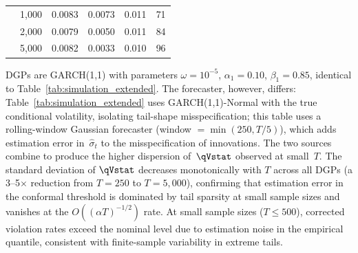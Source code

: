 \begin{table}[H]
\begin{tabular}{@{}llcccc@{}}
		& 1,000   & 0.0083 & 0.0073 & 0.011 & 71 \\
		& 2,000   & 0.0079 & 0.0050 & 0.011 & 84 \\
		& 5,000   & 0.0082 & 0.0033 & 0.010 & 96 \\
		\hline\hline
	\end{tabular}
	\begin{minipage}{\linewidth}\footnotesize
		\smallskip
		DGPs are GARCH(1,1) with parameters
		$\omega = 10^{-5}$, $\alpha_1 = 0.10$, $\beta_1 = 0.85$,
		identical to Table~\ref{tab:simulation_extended}.
		The forecaster, however, differs:
		Table~\ref{tab:simulation_extended} uses GARCH(1,1)-Normal
		with the true conditional volatility, isolating tail-shape
		misspecification; this table uses a rolling-window Gaussian
		forecaster (window $= \min(250, T/5)$), which adds estimation
		error in~$\hat\sigma_t$ to the misspecification of innovations.
		The two sources combine to produce the higher dispersion
		of~$\qVstat$ observed at small~$T$.
		The standard deviation of $\qVstat$ decreases monotonically with $T$
		across all DGPs (a 3--5$\times$ reduction from $T=250$ to $T=5{,}000$),
		confirming that estimation error in the conformal threshold is
		dominated by tail sparsity at small sample sizes and vanishes at
		the $O((\alpha T)^{-1/2})$ rate. At small sample sizes
		($T \leq 500$), corrected violation rates exceed the nominal level
		due to estimation noise in the empirical quantile, consistent with
		finite-sample variability in extreme tails.
	\end{minipage}
\end{table}